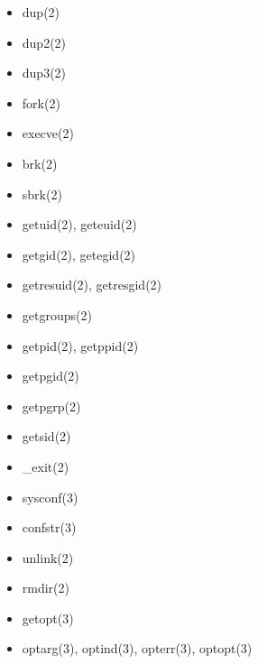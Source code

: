 \documentclass{article}
\begin{document}
\begin{itemize}
\begin{itemize}
\begin{itemize}
                    \item dup(2)
                    \item dup2(2)
                    \item dup3(2)

                    \item fork(2)
                    \item execve(2)
                    \item brk(2)
                    \item sbrk(2)

                    \item getuid(2), geteuid(2)
                    \item getgid(2), getegid(2)
                    \item getresuid(2), getresgid(2)
                    \item getgroups(2)
                    \item getpid(2), getppid(2)
                    \item getpgid(2)
                    \item getpgrp(2)
                    \item getsid(2)

                    \item _exit(2)

                    \item sysconf(3)
                    \item confstr(3)

                    \item unlink(2)
                    \item rmdir(2)

                    \item getopt(3)
                    \item optarg(3), optind(3), opterr(3), optopt(3)


\end{itemize}
\end{itemize}
\end{itemize}
\end{document}
